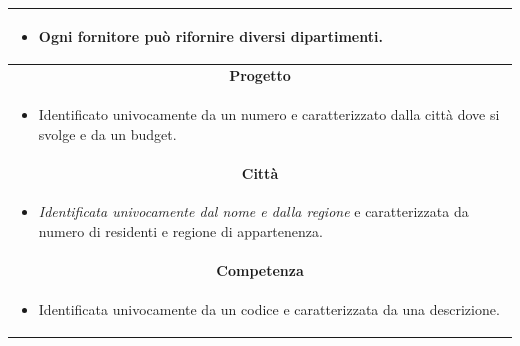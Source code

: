 \documentclass{article}
\begin{document}
\begin{table}[H]
\begin{tabular}{|p{}|}
\begin{itemize}
\item Ogni fornitore può rifornire diversi dipartimenti.
\end{itemize}
\\ \hline
\multicolumn{1}{|c|}{\textbf{Progetto}}
\\ \hline
\begin{itemize}
\item Identificato univocamente da un numero e caratterizzato dalla città dove si svolge e da un budget.
\end{itemize}
\\ \hline
\multicolumn{1}{|c|}{\textbf{Città}}
\\ \hline
\begin{itemize}
\item \textit{Identificata univocamente dal nome e dalla regione} e caratterizzata da numero di residenti e regione di appartenenza.
\end{itemize}
\\ \hline
\multicolumn{1}{|c|}{\textbf{Competenza}}
\\ \hline
\begin{itemize}
\item Identificata univocamente da un codice e caratterizzata da una descrizione.
\end{itemize}
\\ \hline
\end{tabular}
\end{table}

\newpage
\end{document}
